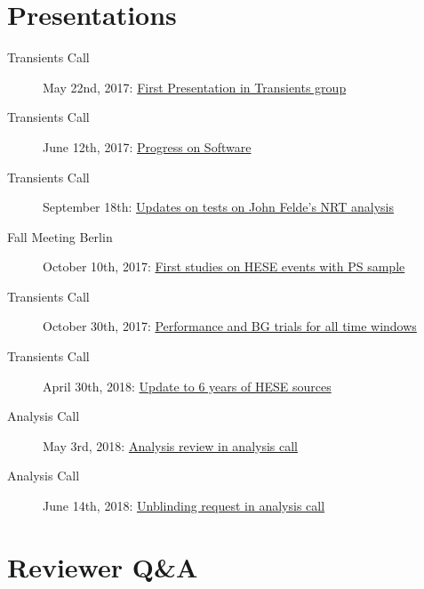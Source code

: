 \section{Presentations}
\begin{description}
  \item[Transients Call] May 22nd, 2017: \href{https://drive.google.com/file/d/0B_Gkg-MCR-1za1RMbjlzTFE0YVU/view}{First Presentation in Transients group}
  \item[Transients Call] June 12th, 2017: \href{https://drive.google.com/file/d/0B_Gkg-MCR-1zTFI3Umg3XzZrSE0/view}{Progress on Software}
  \item[Transients Call] September 18th: \href{https://drive.google.com/file/d/0B_Gkg-MCR-1zR28tTmhBT3VYTGs/view}{Updates on tests on John Felde's NRT analysis}
  \item[Fall Meeting Berlin] October 10th, 2017: \href{https://events.icecube.wisc.edu/getFile.py/access?contribId=37&sessionId=32&resId=0&materialId=slides&confId=90}{First studies on HESE events with PS sample}
  \item[Transients Call] October 30th, 2017: \href{https://drive.google.com/file/d/0B_Gkg-MCR-1zOFdkajczT3JWNUU/view}{Performance and BG trials for all time windows}
  \item[Transients Call] April 30th, 2018: \href{https://drive.google.com/file/d/12vOMOpt1nMrmnBdM_4wV5sMdg0FUJLqF/view}{Update to 6 years of HESE sources}
  \item[Analysis Call] May 3rd, 2018: \href{https://drive.google.com/file/d/199a-w_JzH4m6RdVKmOb57rWMw4-HDSJj/view}{Analysis review in analysis call}
  \item[Analysis Call] June 14th, 2018: \href{https://drive.google.com/file/d/1IWSqQdm1H_ZeW7z7X9LVM6ZrtsWEdilZ/view}{Unblinding request in analysis call}
\end{description}

\section*{Reviewer Q\&A}
